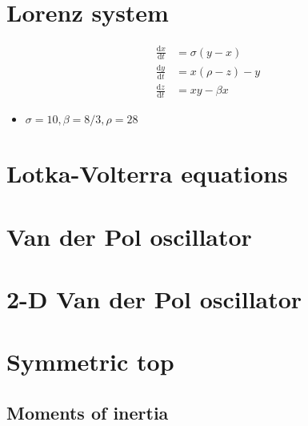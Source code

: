\documentclass{report}
\begin{document}

\chapter{Lorenz system}

\begin{align}
  \frac{\mathrm{d}x}{\mathrm{d}t} &= \sigma(y - x) \\
  \frac{\mathrm{d}y}{\mathrm{d}t} &= x(\rho - z) - y \\
  \frac{\mathrm{d}z}{\mathrm{d}t} &= xy - \beta x
\end{align}

\begin{itemize}
  \item $\sigma = 10, \beta = 8/3, \rho = 28$
\end{itemize}


\chapter{Lotka-Volterra equations}


\chapter{Van der Pol oscillator}


\chapter{2-D Van der Pol oscillator}


\chapter{Symmetric top}

\section{Moments of inertia}
\end{document}
